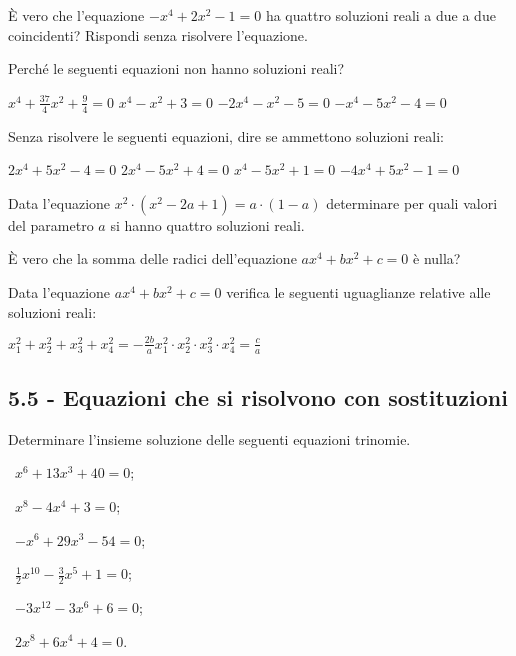 \begin{esercizio}
 \label{ese:5.26}
È vero che l'equazione $-x^4+2x^2-1=0$ ha quattro soluzioni reali a due a due coincidenti? Rispondi senza risolvere l'equazione.
\end{esercizio}

\begin{esercizio}
 \label{ese:5.27}
Perché le seguenti equazioni non hanno soluzioni reali?

\boxA\; $x^4+\frac{37} 4x^2+\frac 9 4=0$\quad \boxB\; $x^4-x^2+3=0$\quad\boxC\; $-2x^4-x^2-5=0$\quad\boxD\; $-x^4-5x^2-4=0$
\end{esercizio}

\begin{esercizio}[\Ast]
 \label{ese:5.28}
Senza risolvere le seguenti equazioni, dire se ammettono soluzioni reali:

\boxA\; $2x^4+5x^2-4=0$\quad \boxB\; $2x^4-5x^2+4=0$\quad\boxC\; $x^4-5x^2+1=0$\quad\boxD\; $-4x^4+5x^2-1=0$
\end{esercizio}

\begin{esercizio}[\Ast]
 \label{ese:5.29}
Data l'equazione $x^2\cdot \left(x^2-2a+1\right)=a\cdot (1-a)$ determinare per quali valori del parametro $a$ si hanno quattro soluzioni reali.
\end{esercizio}

\begin{esercizio}
 \label{ese:5.30}
È vero che la somma delle radici dell'equazione $ax^4+bx^2+c=0$ è nulla?
\end{esercizio}

\begin{esercizio}
 \label{ese:5.31}
Data l'equazione $ax^4+bx^2+c=0$ verifica le seguenti uguaglianze relative alle soluzioni reali:

\boxA\quad $x_1^2+x_2^2+x_3^2+x_4^2=-\frac{2b} a$\qquad \boxB\quad $x_1^2\cdot x_2^2\cdot x_3^2\cdot x_4^2=\frac c a$
\end{esercizio}

\subsection*{5.5 - Equazioni che si risolvono con sostituzioni}

\begin{esercizio}
 \label{ese:5.32}
Determinare l'insieme soluzione delle seguenti equazioni trinomie.
\begin{multicols}{2}
 \begin{enumeratea}
 \item~$x^6+13x^3+40=0$;
 \item~$x^8-4x^4+3=0$;
 \item~$-x^6+29x^3-54=0$;
 \item~$\frac 1 2x^{10}-\frac 3 2x^5+1=0$;
 \item~$-3x^{12}-3x^6+6=0$;
 \item~$2x^8+6x^4+4=0$.
 \end{enumeratea}
\end{multicols}
\end{esercizio}


